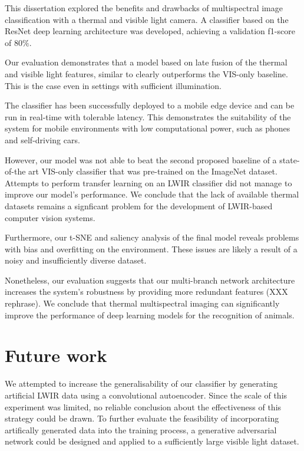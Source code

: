 \documentclass{l4proj}
\begin{document}
This dissertation explored the benefits and drawbacks of multispectral image classification with a thermal and visible light camera. A classifier based on the ResNet deep learning architecture was developed, achieving a validation f1-score of $80\%$.

Our evaluation demonstrates that a model based on late fusion of the thermal and visible light features, similar to \citet{wagner_multispectral_2016} clearly outperforms the VIS-only baseline. This is the case even in settings with sufficient illumination.

The classifier has been successfully deployed to a mobile edge device and can be run in real-time with tolerable latency. This demonstrates the suitability of the system for mobile environments with low computational power, such as phones and self-driving cars.

However, our model was not able to beat the second proposed baseline of a state-of-the art VIS-only classifier that was pre-trained on the ImageNet dataset. Attempts to perform transfer learning on an LWIR classifier did not manage to improve our model's performance. We conclude that the lack of available thermal datasets remains a signficant problem for the development of LWIR-based computer vision systems.

Furthermore, our t-SNE and saliency analysis of the final model reveals problems with bias and overfitting on the environment. These issues are likely a result of a noisy and insufficiently diverse dataset. 

Nonetheless, our evaluation suggests that our multi-branch network architecture increases the system's robustness by providing more redundant features (XXX rephrase). We conclude that thermal multispectral imaging can significantly improve the performance of deep learning models for the recognition of animals.


\section{Future work}

We attempted to increase the generalisability of our classifier by generating artificial LWIR data using a convolutional autoencoder. Since the scale of this experiment was limited, no reliable conclusion about the effectiveness of this strategy could be drawn. To further evaluate the feasibility of incorporating artifically generated data into the training process, a generative adversarial network could be designed and applied to a sufficiently large visible light dataset.
\end{document}
